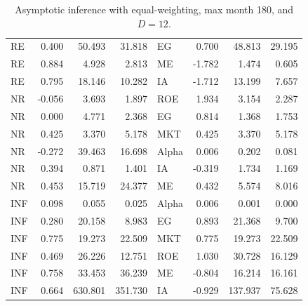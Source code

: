 \documentclass[12pt]{article}
\begin{document}
\begin{table}[ht]
\begin{tabular}{lrrrlrrr}
RE & 0.400 & 50.493 & 31.818 & EG & 0.700 & 48.813 & 29.195 \\ 
RE & 0.884 & 4.928 & 2.813 & ME & -1.782 & 1.474 & 0.605 \\ 
RE & 0.795 & 18.146 & 10.282 & IA & -1.712 & 13.199 & 7.657 \\ 
\hline
NR & -0.056 & 3.693 & 1.897 & ROE & 1.934 & 3.154 & 2.287 \\ 
NR & 0.000 & 4.771 & 2.368 & EG & 0.814 & 1.368 & 1.753 \\ 
NR & 0.425 & 3.370 & 5.178 & MKT & 0.425 & 3.370 & 5.178 \\ 
NR & -0.272 & 39.463 & 16.698 & Alpha & 0.006 & 0.202 & 0.081 \\ 
NR & 0.394 & 0.871 & 1.401 & IA & -0.319 & 1.734 & 1.169 \\ 
NR & 0.453 & 15.719 & 24.377 & ME & 0.432 & 5.574 & 8.016 \\ 
\hline
INF & 0.098 & 0.055 & 0.025 & Alpha & 0.006 & 0.001 & 0.000 \\ 
INF & 0.280 & 20.158 & 8.983 & EG & 0.893 & 21.368 & 9.700 \\ 
INF & 0.775 & 19.273 & 22.509 & MKT & 0.775 & 19.273 & 22.509 \\ 
INF & 0.469 & 26.226 & 12.751 & ROE & 1.030 & 30.728 & 16.129 \\ 
INF & 0.758 & 33.453 & 36.239 & ME & -0.804 & 16.214 & 16.161 \\ 
INF & 0.664 & 630.801 & 351.730 & IA & -0.929 & 137.937 & 75.628 \\ 
		\hline
		\hline
	\end{tabular}
	\caption{Asymptotic inference with equal-weighting, max month 180, and $D=12$.} 
	\label{tab:ai_180_EW_VYP_SL}
\end{table}
\end{document}
